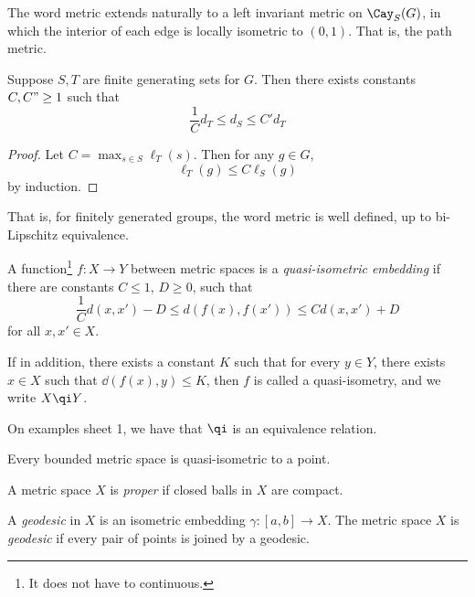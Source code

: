 \documentclass{article}
\begin{document}
\begin{remark}
    The word metric extends naturally to a left invariant metric on \(\Cay_S(G)\), in which the interior of each edge is locally isometric to \((0, 1)\). That is, the path metric.
\end{remark}

\begin{lemma}
    Suppose \(S, T\) are finite  generating sets for \(G\). Then there exists constants \(C, C" \ge 1\) such that
    \[\frac{1}{C}d_T \le d_S \le C' d_T\]
\end{lemma}

\begin{proof}
    Let \(C = \max_{s \in S}\ell_T(s)\). Then for any \(g\in G\),
    \[\ell_T(g) \le C\ell_S(g)\]
    by induction.
\end{proof}

That is, for finitely generated groups, the word metric is well defined, up to bi-Lipschitz equivalence.

\begin{definition}
     A function\footnote{It does not have to continuous.} \(f : X \to Y\) between metric spaces is a \emph{quasi-isometric embedding} if there are constants \(C \le 1\), \(D \ge 0\), such that
    \[\frac{1}{C}d(x, x') - D \le d(f(x), f(x')) \le Cd(x, x') + D\]
    for all \(x, x' \in X\).

    If in addition, there exists a constant \(K\) such that for every \(y \in Y\), there exists \(x \in X\) such that \(\dd(f(x), y) \le K\), then \(f\) is called a quasi-isometry, and we write \(X \qi Y\).
\end{definition}

\begin{remark}
    On examples sheet 1, we have that \(\qi\) is an equivalence relation.
\end{remark}

\begin{example}
    Every bounded metric space is quasi-isometric to a point.
\end{example}

\begin{definition}
    [proper]
    A metric space \(X\) is \emph{proper} if closed balls in \(X\) are compact.
\end{definition}

\begin{definition}
    [geodesic]
    A \emph{geodesic} in \(X\) is an isometric embedding \(\gamma : [a, b] \to X\). The metric space \(X\) is \emph{geodesic} if every pair of points is joined by a geodesic.
\end{definition}
\end{document}
